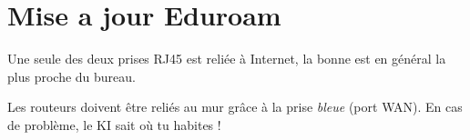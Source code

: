 \documentclass{ki}
\begin{document}
\lipsum[1-15]

\section{Mise a jour Eduroam}

\begin{kiframe}
    Une seule des deux prises RJ45 est reliée à Internet, la bonne est en général la plus proche du bureau.

    Les routeurs doivent être reliés au mur grâce à la prise \emph{bleue} (port WAN). En cas de problème, le KI sait où tu habites !
\end{kiframe}
\end{document}

